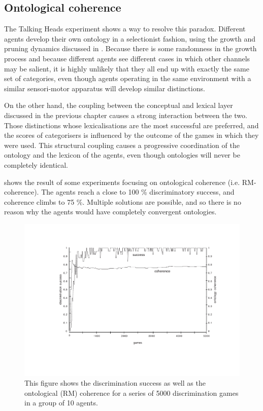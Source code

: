 \subsection{Ontological coherence}

The Talking Heads experiment shows a way to resolve
this paradox. Different agents develop their own 
ontology in a selectionist fashion,
using the growth and pruning dynamics discussed in . 
Because there is some randomness in the growth
process and because different agents see different cases
in which other channels may be salient, it is highly
unlikely that they all end up with exactly the same 
set of categories, even though 
agents operating in the same environment with a similar 
sensori-motor apparatus will develop similar distinctions. 

On the other hand, the coupling between the conceptual
and lexical layer discussed in the previous chapter
causes a strong interaction between the two. Those 
distinctions whose lexicalisations are the most successful 
are preferred, and the scores
of categorisers is influenced by the outcome of the 
games in which they were used. This structural coupling
causes a progressive coordination of the ontology and 
the lexicon of the agents, even though ontologies will 
never be completely identical. 

 shows the result of some experiments 
focusing on ontological coherence (i.e. RM-coherence). 
The agents reach a close to 100 \% discriminatory 
success, and coherence climbs to 75 \%. 
Multiple solutions are possible, and so there is no reason why the 
agents would have completely convergent ontologies.

\begin{figure}[htbp]
  \centerline{\includegraphics[width=.80\textwidth]{chap7/figs/coh.pdf}}
\caption{\label{coh}This figure shows the discrimination
success as well as the ontological (RM) coherence for
a series of 5000 discrimination games in a group of 10 agents.}
\end{figure}

